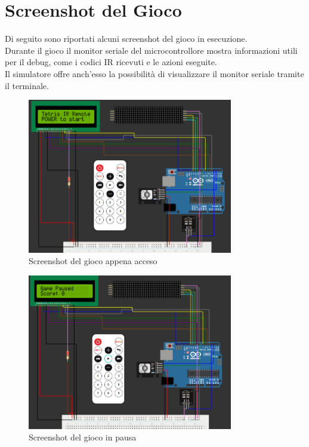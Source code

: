 \documentclass[a4paper, 12pt]{article}
\begin{document}
\section{Screenshot del Gioco}
\label{sec:screenshot}
Di seguito sono riportati alcuni screenshot del gioco in esecuzione.\\
Durante il gioco il monitor seriale del microcontrollore mostra informazioni utili per il debug, come i codici IR ricevuti e le azioni eseguite.\\
Il simulatore offre anch'esso la possibilità di visualizzare il monitor seriale tramite il terminale.

\begin{figure}[H]
    \centering
    \includegraphics[width=0.8\textwidth]{media/appena_acceso.png}
    \caption{Screenshot del gioco appena acceso}
    \label{fig:appena_acceso}
\end{figure}
\begin{figure}[H]
    \centering
    \includegraphics[width=0.8\textwidth]{media/pausa.png}
    \caption{Screenshot del gioco in pausa}
    \label{fig:pausa}
\end{figure}
\end{document}
